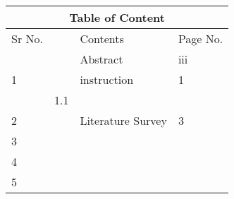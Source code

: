 
\begin{center}
\begin{tabular}{|p{2cm}||p{2cm}|p{4cm}|p{2cm}|  }
 \hline
 \multicolumn{4}{|c|}{Table of Content} \\
 \hline
Sr No.&  &Contents&Page No.\\
 \hline
 &     & Abstract &   iii\\
 \hline
1&     & instruction & 1\\
\hline
 & 1.1 & & \\
 \hline
2   & & Literature Survey&  3\\
 \hline
3 & & & \\
\hline
4 & & & \\
\hline
5 & & & \\
\hline
\end{tabular}
\end{center}
\clearpage